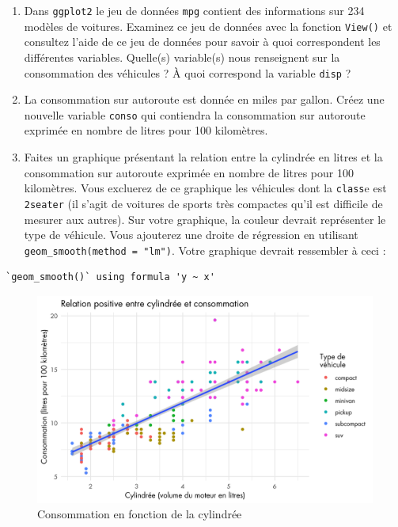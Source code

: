 \documentclass[
  a4paper,
]{article}
\begin{document}
\begin{enumerate}
\def\labelenumi{\arabic{enumi}.}
\item
  Dans \texttt{ggplot2} le jeu de données \texttt{mpg} contient des informations sur 234 modèles de voitures. Examinez ce jeu de données avec la fonction \texttt{View()} et consultez l'aide de ce jeu de données pour savoir à quoi correspondent les différentes variables. Quelle(s) variable(s) nous renseignent sur la consommation des véhicules ? À quoi correspond la variable \texttt{disp} ?
\item
  La consommation sur autoroute est donnée en miles par gallon. Créez une nouvelle variable \texttt{conso} qui contiendra la consommation sur autoroute exprimée en nombre de litres pour 100 kilomètres.
\item
  Faites un graphique présentant la relation entre la cylindrée en litres et la consommation sur autoroute exprimée en nombre de litres pour 100 kilomètres. Vous excluerez de ce graphique les véhicules dont la \texttt{class}e est \texttt{2seater} (il s'agit de voitures de sports très compactes qu'il est difficile de mesurer aux autres). Sur votre graphique, la couleur devrait représenter le type de véhicule. Vous ajouterez une droite de régression en utilisant \texttt{geom\_smooth(method\ =\ "lm")}. Votre graphique devrait ressembler à ceci :
\end{enumerate}

\begin{verbatim}
`geom_smooth()` using formula 'y ~ x'
\end{verbatim}

\begin{figure}[htpb]

{\centering \includegraphics[width=0.9\linewidth]{figure/consommation-1} 

}

\caption{Consommation en fonction de la cylindrée}\label{fig:consommation}
\end{figure}
\end{document}
